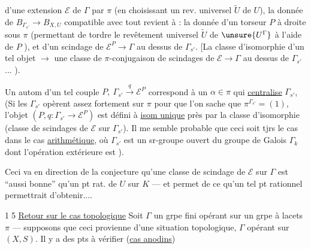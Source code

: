 
d'une extension $\mathcal E$ de \deleted{\unsure{$\Sigma$}} $\Gamma$ par $\pi$ (en choisissant un rev. universel $\widetilde U$ de $U$), la donnée de $B_{\Gamma_{s'}}\longrightarrow B_{X,U}$ compatible avec tout revient  à : la donnée d'un torseur $P$ à droite sous $\pi$ (permettant de tordre le revêtement universel  $\widetilde U$ de $\unsure{U^\Gamma}$ à l'aide de $P$  ), et d'un scindage de $\mathcal E^P\longrightarrow\Gamma$ au dessus de $\Gamma_{s'}$.
[La classe d'isomorphie d'un tel objet $\longrightarrow$ une classe de $\pi$-conjugaison de scindages de $\mathcal E\longrightarrow\Gamma$ au dessus de $\Gamma_{s'}$... ).

Un autom d'un tel couple  $P,\ \Gamma_{s'}\xrightarrow{q}\mathcal E^P$ correspond à un $\alpha\in\pi$ qui \uline{centralise} $\Gamma_{s'}$,  (Si les $\Gamma_{s'}$ opèrent assez fortement sur $\pi$ pour que l'on sache que $\pi^{\Gamma_{s'}}=(1)$, l'objet $(P,q:\Gamma_{s'}\longrightarrow\mathcal E^P)$ est défini à \uline{isom unique} près par la classe d'isomorphie  (classe de scindages de $\mathcal E$ sur $\Gamma_{s'}$).
Il me semble probable que ceci soit tjrs le cas dans le cas \uline{arithmétique}, où $\Gamma_{s'}$ est un sr-groupe ouvert du groupe de Galois $\Gamma_k$ dont l'opération extérieure est ).


Ceci va en direction de la conjecture qu'une classe de scindage de $\mathcal E$ sur $\Gamma$ est ``aussi bonne'' qu'un pt rat. de $U$ sur $K$ --- et permet de  ce qu'un tel pt rationnel permettrait d'obtenir....

\textcircled{15} \uline{Retour sur le cas topologique} Soit $\Gamma$ un grpe fini opérant sur un grpe à lacets $\pi$ --- supposons que ceci provienne d'une situation topologique, $\Gamma$ opérant sur $(X,S)$. Il y a des pts à vérifier (\uline{cas anodins})

